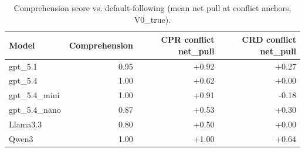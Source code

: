 \begin{table}[t]
\centering
\caption{Comprehension score vs. default-following (mean net pull at conflict anchors, V0\_true).}
\label{tab:comprehension}
\small
\begin{tabular}{lrrr}
\toprule
Model & Comprehension & CPR conflict net\_pull & CRD conflict net\_pull \\
\midrule
gpt\_5.1 & 0.95 & +0.92 & +0.27 \\
gpt\_5.4 & 1.00 & +0.62 & +0.00 \\
gpt\_5.4\_mini & 1.00 & +0.91 & -0.18 \\
gpt\_5.4\_nano & 0.87 & +0.53 & +0.30 \\
Llama3.3 & 0.80 & +0.50 & +0.00 \\
Qwen3 & 1.00 & +1.00 & +0.64 \\
\bottomrule
\end{tabular}
\end{table}
